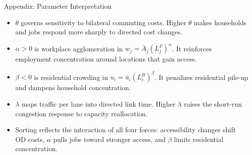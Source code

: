 \documentclass[11pt,aspectratio=169]{beamer}
\newcommand{\navback}[1]{\par\vspace{0.35em}\noindent\hfill\hyperlink{#1}{\beamerreturnbutton{back}}}
\begin{document}
\begin{frame}[label=appparams]{Appendix: Parameter Interpretation}
\begin{itemize}\small
  \item $\theta$ governs sensitivity to bilateral commuting costs. Higher $\theta$ makes households and jobs respond more sharply to directed cost changes.
  \item $\alpha>0$ is workplace agglomeration in $w_j=\bar A_j(L_j^F)^\alpha$. It reinforces employment concentration around locations that gain access.
  \item $\beta<0$ is residential crowding in $u_i=\bar u_i(L_i^R)^\beta$. It penalizes residential pile-up and dampens household concentration.
  \item $\lambda$ maps traffic per lane into directed link time. Higher $\lambda$ raises the short-run congestion response to capacity reallocation.
  \item Sorting reflects the interaction of all four forces: accessibility changes shift OD costs, $\alpha$ pulls jobs toward stronger access, and $\beta$ limits residential concentration.
\end{itemize}
\navback{estparams}
\end{frame}
\end{document}
